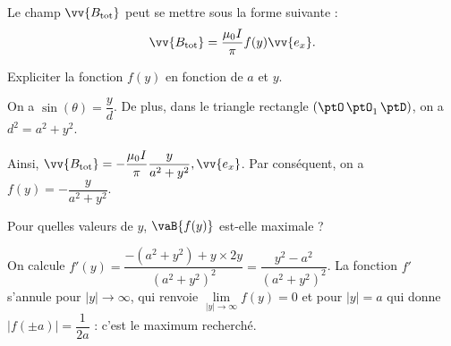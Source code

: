 \pauseEntrainement

\bigskip

Le champ $\vv{B_{\text{tot}}}$ peut se mettre sous la forme suivante :
\[
\vv{B_{\text{tot}}}=\dfrac{\mu_0 I}{\pi}f(y) \vv{e_x}.
\]
 
\repriseEntrainement


\begin{enonce}
Expliciter la fonction $f(y)$ en fonction de $a$ et $y$.
\end{enonce}


\begin{corrige} 
On a $\sin(\theta)=\dfrac{y}{d}$. De plus, dans le triangle rectangle $\left(\ptO\, \ptO_1\, \ptD\right) $, on a   $d^2=a^2+y^2$. 

Ainsi, 
$\vv{B_{\text{tot}}}=-\dfrac{\mu_0 I}{\pi}\dfrac{y}{a^2 + y^2},\vv{e_x}$.
Par conséquent, on a $f(y)=-\dfrac{y}{a^2 + y^2}$.
\end{corrige}



\begin{enonce}
Pour quelles valeurs de $y$, $\vaB{f(y)}$ est-elle maximale ?
\end{enonce}


\begin{corrige}
On calcule $f'(y)=\dfrac{-(a^2+y^2)+y\times 2y}{(a^2 + y^2)^2} = \dfrac{y^2-a^2}{(a^2+y^2)^2}$. La fonction
$f'$ s'annule pour $|y| \to \infty$, qui renvoie $\lim \limits_{|y| \to \infty} f(y) = 0$ et pour $|y|=a$ qui donne $\big|f(\pm a)\big|=\dfrac{1}{2a}$ : c'est le maximum recherché.
\end{corrige}


\finEntrainement




